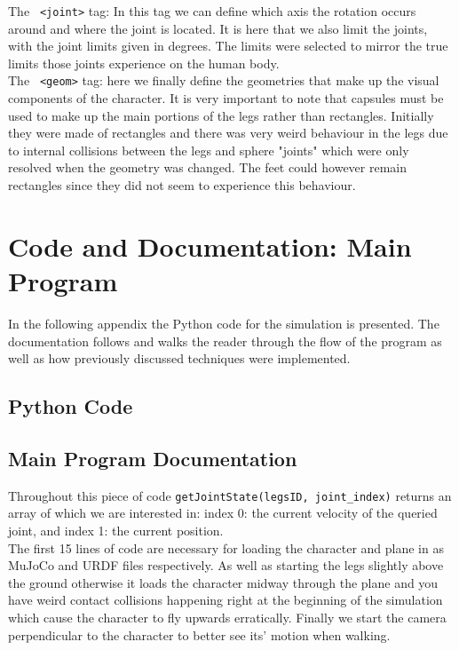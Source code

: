 \documentclass[12pt, a4paper]{article}
\begin{document}
The \verb; <joint>; tag: In this tag we can define which axis the rotation occurs around and where the joint is located. It is here that we also limit the joints, with the joint limits given in degrees. The limits were selected to mirror the true limits those joints experience on the human body. \\

The \verb; <geom>; tag: here we finally define the geometries that make up the visual components of the character. It is very important to note that capsules must be used to make up the main portions of the legs rather than rectangles. Initially they were made of rectangles and there was very weird behaviour in the legs due to internal collisions between the legs and sphere "joints" which were only resolved when the geometry was changed. The feet could however remain rectangles since they did not seem to experience this behaviour.\\ 




\section{Code and Documentation: Main Program}
\label{apdx: main program}
In the following appendix the Python code for the simulation is presented. The documentation follows and walks the reader through the flow of the program as well as how previously discussed techniques were implemented.  
\subsection{Python Code}


\subsection{Main Program Documentation}

Throughout this piece of code \verb;getJointState(legsID, joint_index); returns an array of which we are interested in: index 0: the current velocity of the queried joint, and index 1: the current position.\\

The first 15 lines of code are necessary for loading the character and plane in as MuJoCo and URDF files respectively. As well as starting the legs slightly above the ground otherwise it loads the character midway through the plane and you have weird contact collisions happening right at the beginning of the simulation which cause the character to fly upwards erratically. Finally we start the camera perpendicular to the character to better see its' motion when walking.\\
\end{document}
